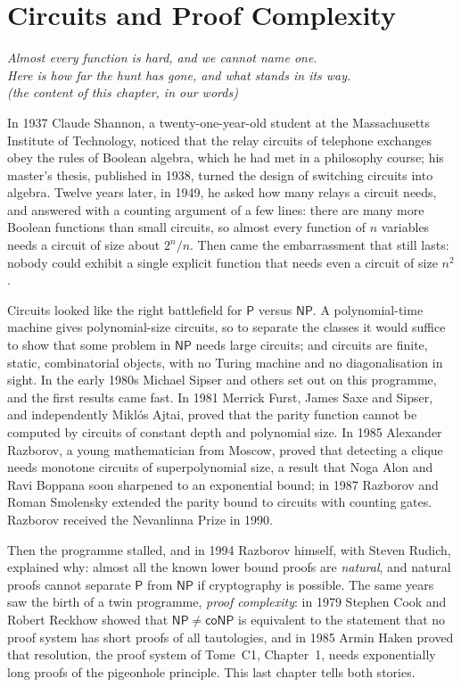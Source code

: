 \chapter{Circuits and Proof Complexity}\label{ch:circuits}

\begin{center}\itshape
Almost every function is hard, and we cannot name one.\\
Here is how far the hunt has gone, and what stands in its way.\\
\upshape(the content of this chapter, in our words)
\end{center}

In 1937 Claude Shannon, a twenty-one-year-old student at the Massachusetts Institute of Technology, noticed that the relay circuits of telephone exchanges obey the rules of Boolean algebra, which he had met in a philosophy course; his master's thesis, published in 1938, turned the design of switching circuits into algebra. Twelve years later, in 1949, he asked how many relays a circuit needs, and answered with a counting argument of a few lines: there are many more Boolean functions than small circuits, so almost every function of $n$ variables needs a circuit of size about $2^n/n$. Then came the embarrassment that still lasts: nobody could exhibit a single explicit function that needs even a circuit of size $n^2$.

Circuits looked like the right battlefield for $\mathsf P$ versus $\mathsf{NP}$. A polynomial-time machine gives polynomial-size circuits, so to separate the classes it would suffice to show that some problem in $\mathsf{NP}$ needs large circuits; and circuits are finite, static, combinatorial objects, with no Turing machine and no diagonalisation in sight. In the early 1980s Michael Sipser and others set out on this programme, and the first results came fast. In 1981 Merrick Furst, James Saxe and Sipser, and independently Miklós Ajtai, proved that the parity function cannot be computed by circuits of constant depth and polynomial size. In 1985 Alexander Razborov, a young mathematician from Moscow, proved that detecting a clique needs monotone circuits of superpolynomial size, a result that Noga Alon and Ravi Boppana soon sharpened to an exponential bound; in 1987 Razborov and Roman Smolensky extended the parity bound to circuits with counting gates. Razborov received the Nevanlinna Prize in 1990.

Then the programme stalled, and in 1994 Razborov himself, with Steven Rudich, explained why: almost all the known lower bound proofs are \emph{natural}, and natural proofs cannot separate $\mathsf P$ from $\mathsf{NP}$ if cryptography is possible. The same years saw the birth of a twin programme, \emph{proof complexity}: in 1979 Stephen Cook and Robert Reckhow showed that $\mathsf{NP}\ne\mathsf{coNP}$ is equivalent to the statement that no proof system has short proofs of all tautologies, and in 1985 Armin Haken proved that resolution, the proof system of Tome~C1, Chapter~1, needs exponentially long proofs of the pigeonhole principle. This last chapter tells both stories.

